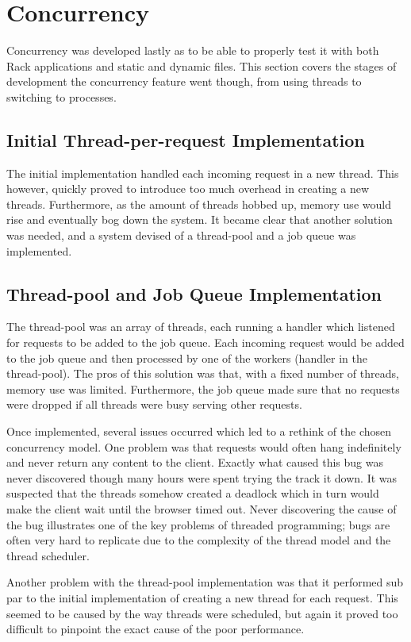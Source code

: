 \section{Concurrency}
Concurrency was developed lastly as to be able to properly test it with both
Rack applications and static and dynamic files. This section covers the stages
of development the concurrency feature went though, from using threads to
switching to processes.

\subsection{Initial Thread-per-request Implementation}
The initial implementation handled each incoming request in a new thread. This
however, quickly proved to introduce too much overhead in creating a new
threads. Furthermore, as the amount of threads hobbed up, memory use would
rise and eventually bog down the system. It became clear that another
solution was needed, and a system devised of a thread-pool and a job queue was
implemented. 

\subsection{Thread-pool and Job Queue Implementation}
The thread-pool was an array of threads, each running a handler which listened
for requests to be added to the job queue. Each incoming request would be added to
the job queue and then processed by one of the workers (handler in the
    thread-pool). The pros of this
solution was that, with a fixed number of threads, memory use was limited.
Furthermore, the job queue made sure that no requests were dropped if all
threads were busy serving other requests. 

Once implemented, several issues occurred which led to a rethink of the chosen
concurrency model. One problem was that requests would often hang indefinitely
and never return any content to the client. Exactly what caused this bug was
never discovered though many hours were spent trying the track it down. It was
suspected that the threads somehow created a deadlock which in turn would make
the client wait until the browser timed out.  Never discovering the cause of
the bug illustrates one of the key problems of threaded programming; bugs are
often very hard to replicate due to the complexity of the thread model and the
thread scheduler. 

Another problem with the thread-pool implementation was that it performed sub
par to the initial implementation of creating a new thread for each request.
This seemed to be caused by the way threads were scheduled, but again it
proved too difficult to pinpoint the exact cause of the poor performance.

